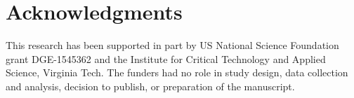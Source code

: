 \documentclass[sigconf]{acmart}
\begin{document}
\maketitle

%






%

\section{Acknowledgments}
This research has been supported in part by US National Science Foundation grant
DGE-1545362 and the Institute for Critical Technology and Applied Science, Virginia
Tech. The funders had no role in study design, data collection and analysis, decision to
publish, or preparation of the manuscript.


 
\end{document}
